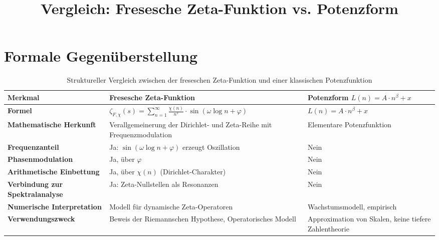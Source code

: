 \documentclass{article}
\title{Vergleich: Fresesche Zeta-Funktion vs. Potenzform}
\author{}
\date{}
\begin{document}
\maketitle

\section*{Formale Gegenüberstellung}

\begin{table}[h!]
\centering
\renewcommand{\arraystretch}{1.4}
\begin{tabular}{@{}p{4.5cm} | p{5.8cm} | p{5.8cm}@{}}
\toprule
\textbf{Merkmal} & \textbf{Fresesche Zeta-Funktion} & \textbf{Potenzform $L(n) = A \cdot n^\beta + x$} \\
\midrule
\textbf{Formel} &
$\displaystyle \zeta_{F,\chi}(s) = \sum_{n=1}^\infty \frac{\chi(n)}{n^s} \cdot \sin(\omega \log n + \varphi)$ &
$\displaystyle L(n) = A \cdot n^\beta + x$ \\
\textbf{Mathematische Herkunft} & Verallgemeinerung der Dirichlet- und Zeta-Reihe mit Frequenzmodulation & Elementare Potenzfunktion \\
\textbf{Frequenzanteil} & Ja: $\sin(\omega \log n + \varphi)$ erzeugt Oszillation & Nein \\
\textbf{Phasenmodulation} & Ja, über $\varphi$ & Nein \\
\textbf{Arithmetische Einbettung} & Ja, über $\chi(n)$ (Dirichlet-Charakter) & Nein \\
\textbf{Verbindung zur Spektralanalyse} & Ja: Zeta-Nullstellen als Resonanzen & Nein \\
\textbf{Numerische Interpretation} & Modell für dynamische Zeta-Operatoren & Wachstumsmodell, empirisch \\
\textbf{Verwendungszweck} & Beweis der Riemannschen Hypothese, Operatorisches Modell & Approximation von Skalen, keine tiefere Zahlentheorie \\
\bottomrule
\end{tabular}
\caption{Struktureller Vergleich zwischen der freseschen Zeta-Funktion und einer klassischen Potenzfunktion}
\end{table}
\end{document}
